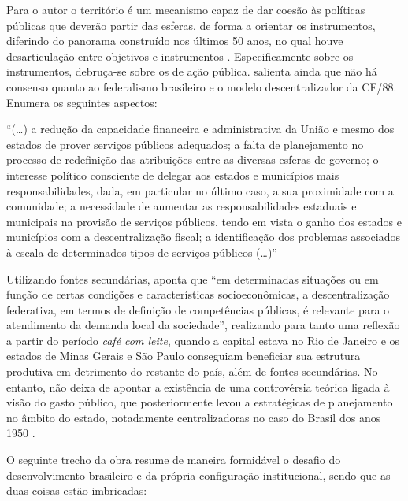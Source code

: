\documentclass[
article,			%
11pt,				%
oneside,			%
a4paper,			%
english,			%
brazil,				%
sumario=tradicional
]{abntex2}
\begin{document}
	Para o autor o território é um mecanismo capaz de dar coesão às políticas públicas que deverão partir das esferas, de forma a orientar os instrumentos, diferindo do panorama construído nos últimos 50 anos, no qual houve desarticulação entre objetivos e instrumentos \cite[p. 90]{mendes2012}. Especificamente sobre os instrumentos,  debruça-se sobre os de ação pública.  salienta ainda que não há consenso quanto ao federalismo brasileiro e o modelo descentralizador da CF/88. Enumera os seguintes aspectos:
	
	\begin{citacao}
		``(\dots) a redução da capacidade financeira e administrativa da União e mesmo dos estados de prover serviços públicos adequados; a falta de 	planejamento no processo de redefinição das atribuições entre as diversas esferas 		de governo; o interesse político consciente de delegar aos estados e municípios 	mais responsabilidades, dada, em particular no último caso, a sua proximidade 	com a comunidade; a necessidade de aumentar as responsabilidades estaduais e municipais na provisão de serviços públicos, tendo em vista o ganho dos estados e municípios com a descentralização fiscal; a identificação dos problemas associados à escala de determinados tipos de serviços públicos (\dots)'' \cite[p. 90]{mendes2012}
	\end{citacao}
	
	Utilizando fontes secundárias,  aponta que ``em determinadas situações ou em função de certas condições e	características socioeconômicas, a descentralização federativa, em termos de definição de competências públicas, é relevante para o atendimento da demanda local da sociedade'', realizando para tanto uma reflexão a partir do período \textit{café com leite}, quando a capital estava no Rio de Janeiro e os estados de Minas Gerais e São Paulo conseguiam beneficiar sua estrutura produtiva em detrimento do restante do país, além de fontes secundárias. No entanto,  não deixa de apontar a existência de uma controvérsia teórica ligada à visão do gasto público, que posteriormente levou a estratégicas de planejamento no âmbito do estado, notadamente centralizadoras no caso do Brasil dos anos 1950 \cite[p. 94]{mendes2012}.
	
	O seguinte trecho da obra resume de maneira formidável o desafio do desenvolvimento brasileiro e da própria configuração institucional, sendo que as duas coisas estão imbricadas:
	
\end{document}
